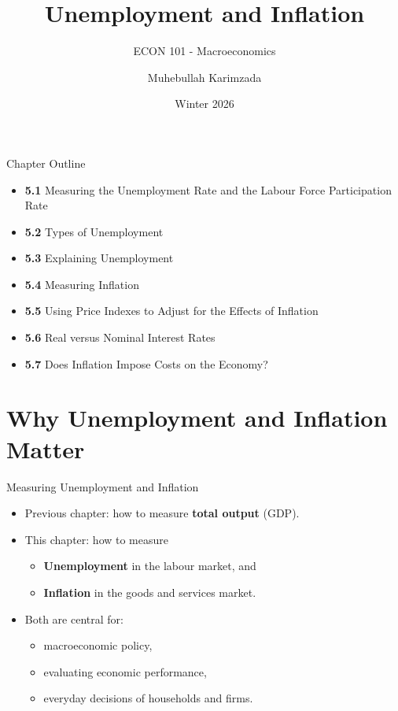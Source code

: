 \documentclass[aspectratio=169]{beamer}
\title{\textbf{Unemployment and Inflation \vspace{.5cm}\\  }}
\subtitle{ {\large ECON 101 - Macroeconomics}}
\author{Muhebullah Karimzada}
\date{Winter 2026}
\begin{document}
\begin{frame}[plain]
  \titlepage
\end{frame}

\begin{frame}{Chapter Outline}
\transfade
\begin{itemize}[<+->]
  \item \textbf{5.1} Measuring the Unemployment Rate and the Labour Force Participation Rate
  \item \textbf{5.2} Types of Unemployment
  \item \textbf{5.3} Explaining Unemployment
  \item \textbf{5.4} Measuring Inflation
  \item \textbf{5.5} Using Price Indexes to Adjust for the Effects of Inflation
  \item \textbf{5.6} Real versus Nominal Interest Rates
  \item \textbf{5.7} Does Inflation Impose Costs on the Economy?
\end{itemize}
\end{frame}

\section*{Why Unemployment and Inflation Matter}

\begin{frame}{Measuring Unemployment and Inflation}
\transfade
\begin{itemize}[<+->]
  \item Previous chapter: how to measure \textbf{total output} (GDP).
  \item This chapter: how to measure
  \begin{itemize}[<+->]
    \item \textbf{Unemployment} in the labour market, and
    \item \textbf{Inflation} in the goods and services market.
  \end{itemize}
  \item Both are central for:
  \begin{itemize}[<+->]
    \item macroeconomic policy,
    \item evaluating economic performance,
    \item everyday decisions of households and firms.
  \end{itemize}
\end{itemize}
\end{frame}
\end{document}
